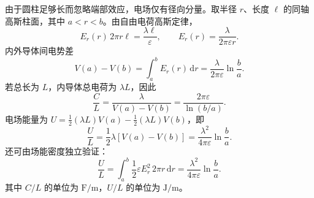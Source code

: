 由于圆柱足够长而忽略端部效应，电场仅有径向分量。取半径 $r$、长度 $\ell$ 的同轴高斯柱面，其中 $a<r<b$。由自由电荷高斯定律，
\[
E_r(r)\,2\pi r\ell=\frac{\lambda\ell}{\varepsilon},
\qquad E_r(r)=\frac{\lambda}{2\pi\varepsilon r}.
\]
内外导体间电势差
\[
V(a)-V(b)=\int_a^b E_r(r)\,\mathrm dr
=\frac{\lambda}{2\pi\varepsilon}\ln\frac ba.
\]
若总长为 $L$，内导体总电荷为 $\lambda L$，因此
\[
\boxed{\frac CL=\frac{\lambda}{V(a)-V(b)}
=\frac{2\pi\varepsilon}{\ln(b/a)}}.
\]
电场能量为 $U=\frac12(\lambda L)V(a)-\frac12(\lambda L)V(b)$，即
\[
\boxed{\frac UL=\frac12\lambda[V(a)-V(b)]
=\frac{\lambda^2}{4\pi\varepsilon}\ln\frac ba}.
\]
还可由场能密度独立验证：
\[
\frac UL=\int_a^b\frac12\varepsilon E_r^2\,2\pi r\,\mathrm dr
=\frac{\lambda^2}{4\pi\varepsilon}\ln\frac ba.
\]
其中 $C/L$ 的单位为 $\mathrm{F/m}$，$U/L$ 的单位为 $\mathrm{J/m}$。
